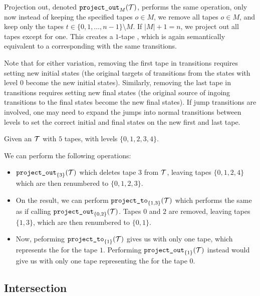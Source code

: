 Projection out, denoted $\texttt{project\_out}_{M}(\mathcal{T})$, performs the same operation, only now instead of keeping the specified tapes $o \in M$, we remove all tapes $o \in M$, and keep only the tapes $t \in \{ 0, 1, \ldots, n - 1 \} \setminus M$.
If $|M| + 1 = n$, we project out all tapes except for one.
This creates a $1$-tape \nft, which is again semantically equivalent to a corresponding \nfa with the same transitions.

Note that for either variation, removing the first tape in \nft transitions requires setting new initial states (the original targets of transitions from the states with level $0$ become the new initial states).
Similarly, removing the last tape in \nft transitions requires setting new final states (the original source of ingoing transitions to the final states become the new final states).
If jump transitions are involved, one may need to expand the jumps into normal transitions between levels to set the correct initial and final states on the new first and last tape.

\begin{example}
  Given an \nft $\mathcal{T}$ with $5$ tapes, with levels $\{ 0, 1, 2, 3, 4 \}$.

  We can perform the following operations:
  \begin{itemize}
    \item $\texttt{project\_out}_{\{ 3 \}}(\mathcal{T})$ which deletes tape $3$ from $\mathcal{T}$, leaving tapes $\{ 0, 1, 2, 4 \}$ which are then renumbered to $\{ 0, 1, 2, 3 \}$.
    \item On the result, we can perform $\texttt{project\_to}_{\{ 1, 3 \}}(\mathcal{T})$ which performs the same as if calling $\texttt{project\_out}_{\{ 0, 2 \} }(\mathcal{T})$.
    Tapes $0$ and $2$ are removed, leaving tapes $\{ 1, 3 \}$, which are then renumbered to $\{ 0, 1 \}$.
    \item Now, peforming $\texttt{project\_to}_{\{ 1 \}}(\mathcal{T})$ gives us \nft with only one tape, which represents the \nfa for the tape $1$.
    Performing $\texttt{project\_out}_{\{ 1 \}}(\mathcal{T})$ instead would give us \nft with only one tape representing the \nfa for the tape $0$.
  \end{itemize}

\end{example}

\subsection{Intersection}\label{sec:intersection}

